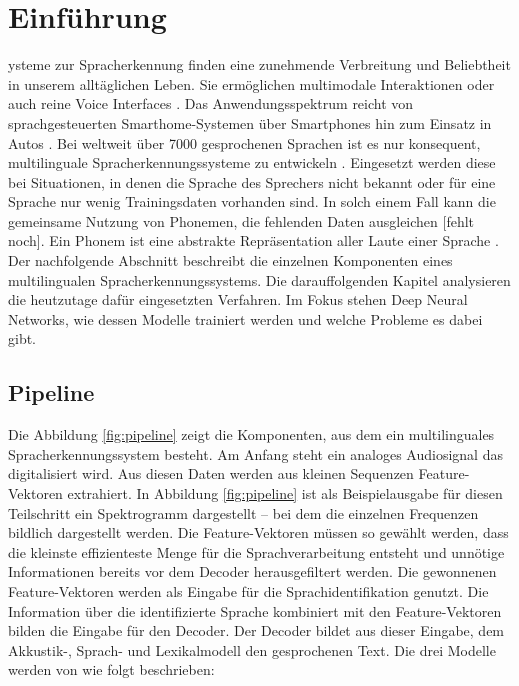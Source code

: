 \section{Einführung}\label{sec:introduction}
ysteme zur Spracherkennung finden eine zunehmende Verbreitung und Beliebtheit in unserem alltäglichen Leben.
Sie ermöglichen multimodale Interaktionen oder auch reine Voice Interfaces \cite{Harris.2004}.
Das Anwendungsspektrum reicht von sprachgesteuerten Smarthome-Systemen über Smartphones hin zum Einsatz in Autos \cite{Yu.2014}.
Bei weltweit über 7000 gesprochenen Sprachen ist es nur konsequent, multilinguale Spracherkennungssysteme zu entwickeln \cite{Gary.2018}.
Eingesetzt werden diese bei Situationen, in denen die Sprache des Sprechers nicht bekannt oder für eine Sprache nur wenig
Trainingsdaten vorhanden sind. In solch einem Fall kann die gemeinsame Nutzung von Phonemen, die fehlenden Daten ausgleichen [fehlt noch].
Ein Phonem ist eine abstrakte Repräsentation aller Laute einer Sprache .
Der nachfolgende Abschnitt beschreibt die einzelnen Komponenten eines multilingualen Spracherkennungssystems.
Die darauffolgenden Kapitel analysieren die heutzutage dafür eingesetzten Verfahren.
Im Fokus stehen Deep Neural Networks, wie dessen Modelle trainiert werden und welche Probleme es dabei gibt.

\subsection{Pipeline}
Die Abbildung \ref{fig:pipeline} zeigt die Komponenten, aus dem ein multilinguales Spracherkennungssystem besteht.
Am Anfang steht ein analoges Audiosignal das digitalisiert wird. Aus diesen Daten werden aus kleinen Sequenzen
Feature-Vektoren extrahiert. In Abbildung \ref{fig:pipeline} ist als Beispielausgabe für diesen Teilschritt ein Spektrogramm dargestellt – bei dem die einzelnen Frequenzen bildlich dargestellt werden.
Die Feature-Vektoren müssen so gewählt werden, dass die kleinste effizienteste Menge für die Sprachverarbeitung
entsteht und unnötige Informationen bereits vor dem Decoder herausgefiltert werden.
Die gewonnenen Feature-Vektoren werden als Eingabe für die Sprachidentifikation genutzt. Die Information
über die identifizierte Sprache kombiniert mit den Feature-Vektoren bilden die Eingabe für den Decoder. Der Decoder bildet aus dieser Eingabe,
dem Akkustik-, Sprach- und Lexikalmodell den gesprochenen Text. Die drei Modelle werden von \cite{Tom.2016} wie folgt beschrieben:

